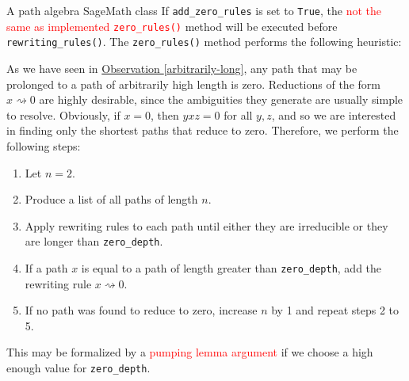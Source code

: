 \begin{chapter}{A path algebra SageMath class}
If \texttt{add\_zero\_rules} is set to \texttt{True}, the \textcolor{red}{not the same as implemented \texttt{zero\_rules()}} method will be executed before \texttt{rewriting\_rules()}. The \texttt{zero\_rules()} method performs the following heuristic:
\begin{heur} As we have seen in \hyperref[arbitrarily-long]{Observation \ref*{arbitrarily-long}},  any path that may be prolonged to a path of arbitrarily high length is zero. Reductions of the form $x\rightsquigarrow 0$ are highly desirable, since the ambiguities they generate are usually simple to resolve. Obviously, if $x=0$, then $yxz=0$ for all $y,z$, and so we are interested in finding only the shortest paths that reduce to zero. Therefore, we perform the following steps:
\begin{enumerate}
\item Let $n=2$.
\item Produce a list of all paths of length $n$.
\item Apply rewriting rules to each path until either they are irreducible or they are longer than \texttt{zero\_depth}.
\item If a path $x$ is equal to a path of length greater than \texttt{zero\_depth}, add the rewriting rule $x\rightsquigarrow 0$.
\item If no path was found to reduce to zero, increase $n$ by 1 and repeat steps 2 to 5.
\end{enumerate}
This may be formalized by a \textcolor{red}{pumping lemma argument} if we choose a high enough value for \texttt{zero\_depth}.
\end{heur}


\end{chapter}
